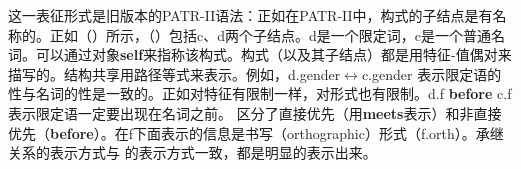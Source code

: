 \noindent
这一表征形式是旧版本的PATR-II语法\citep*{SURT83a}：正如在PATR-II中，构式的子结点是有名称的。正如（）所示，（）包括c、d两个子结点。d是一个限定词，c是一个普通名词。可以通过对象\textbf{self}来指称该构式。构式（以及其子结点）都是用特征-值偶对来描写的。结构共享用路径等式来表示。例如，d.gender$\leftrightarrow$c.gender 表示限定语的性与名词的性是一致的。正如对特征有限制一样，对形式也有限制。d.f \textbf{before} c.f 表示限定语一定要出现在名词之前。 \citet{BC2005a} 区分了直接优先（用\textbf{meets}表示）和非直接优先（\textbf{before}）。在f下面表示的信息是书写（orthographic）形式（f.orth）。承继关系的表示方式与  \citet{KF99a}的表示方式一致，都是明显的表示出来。

